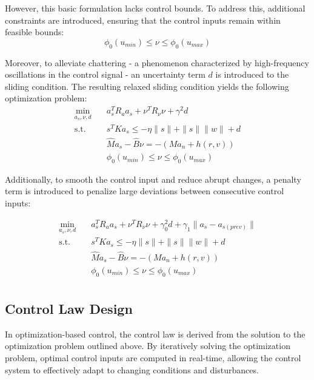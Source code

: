 However, this basic formulation lacks control bounds. 
To address this, additional constraints are introduced, 
ensuring that the control inputs remain within feasible bounds:
\begin{equation}
\phi_0(u_{min}) \leq \nu \leq \phi_0(u_{max})
\end{equation}

Moreover, to alleviate chattering - a phenomenon characterized 
by high-frequency oscillations in the control signal - an uncertainty 
term $d$ is introduced to the sliding condition. The resulting relaxed 
sliding condition yields the following optimization problem:
\begin{equation}
\begin{aligned}
\min_{a_s, \nu, d} \quad & a_s^T R_a a_s + \nu^T R_\nu \nu + \gamma^2 d\\
\textrm{s.t.} \quad & s^TKa_s \leq -\eta \|s\| + \|s\|\|w\| + d\\
&\hat Ma_s - \hat B\nu = -(Ma_n + h(r, v)) \\
&\phi_0(u_{min}) \leq \nu \leq \phi_0(u_{max})
\end{aligned}
\end{equation}

Additionally, to smooth the control input and reduce abrupt changes, 
a penalty term is introduced to penalize large deviations between 
consecutive control inputs:

\begin{equation}
\begin{aligned}
\min_{a_s, \nu, d} \quad & a_s^T R_a a_s + \nu^T R_\nu \nu +
\gamma_0^2 d + \gamma_1 \|a_s - a_{s (prev)}\|\\
\textrm{s.t.} \quad & s^TKa_s \leq -\eta \|s\| + \|s\|\|w\| + d\\
&\hat Ma_s - \hat B\nu = -(Ma_n + h(r, v)) \\
&\phi_0(u_{min}) \leq \nu \leq \phi_0(u_{max}) \\
\end{aligned}
\end{equation}

\subsection{Control Law Design}

In optimization-based control, the control law is derived from 
the solution to the optimization problem outlined above. 
By iteratively solving the optimization problem, optimal control inputs 
are computed in real-time, allowing the control system to effectively 
adapt to changing conditions and disturbances.

